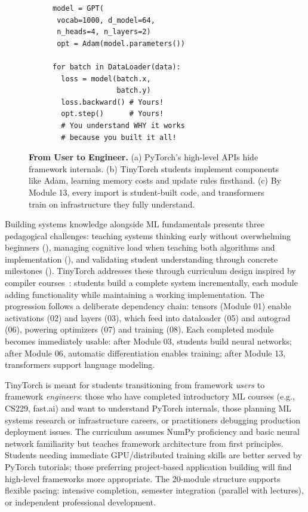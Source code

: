 \documentclass[10pt,twocolumn]{article}
\begin{document}
\begin{figure}[t]
\begin{minipage}[b]{0.3\textwidth}
\begin{subfigure}[b]{\textwidth}
\begin{lstlisting}[basicstyle=\fontsize{6}{7}\selectfont\ttfamily,frame=single,style=pythonstyle]
model = GPT(
 vocab=1000, d_model=64,
 n_heads=4, n_layers=2)
 opt = Adam(model.parameters())

for batch in DataLoader(data):
  loss = model(batch.x,
               batch.y)
  loss.backward() # Yours!
  opt.step()      # Yours!
  # You understand WHY it works
  # because you built it all!
\end{lstlisting}
\vspace{0.15em}
\label{lst:tinytorch-culmination}
\end{subfigure}
\end{minipage}
\hfill
\caption{\textbf{From User to Engineer.} (a) PyTorch's high-level APIs hide framework internals. (b) TinyTorch students implement components like Adam, learning memory costs and update rules firsthand. (c) By Module 13, every import is student-built code, and transformers train on infrastructure they fully understand.}
\label{fig:code-comparison}
\end{figure}


Building systems knowledge alongside ML fundamentals presents three pedagogical challenges: teaching systems thinking early without overwhelming beginners (), managing cognitive load when teaching both algorithms and implementation (), and validating student understanding through concrete milestones (). TinyTorch addresses these through curriculum design inspired by compiler courses~\citep{aho2006compilers}: students build a complete system incrementally, each module adding functionality while maintaining a working implementation. The progression follows a deliberate dependency chain: tensors (Module 01) enable activations (02) and layers (03), which feed into dataloader (05) and autograd (06), powering optimizers (07) and training (08). Each completed module becomes immediately usable: after Module 03, students build neural networks; after Module 06, automatic differentiation enables training; after Module 13, transformers support language modeling.

TinyTorch is meant for students transitioning from framework \emph{users} to framework \emph{engineers}: those who have completed introductory ML courses (e.g., CS229, fast.ai) and want to understand PyTorch internals, those planning ML systems research or infrastructure careers, or practitioners debugging production deployment issues. The curriculum assumes NumPy proficiency and basic neural network familiarity but teaches framework architecture from first principles. Students needing immediate GPU/distributed training skills are better served by PyTorch tutorials; those preferring project-based application building will find high-level frameworks more appropriate. The 20-module structure supports flexible pacing: intensive completion, semester integration (parallel with lectures), or independent professional development.
\end{document}
